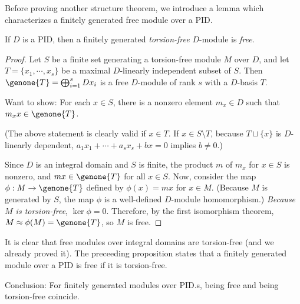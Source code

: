 Before proving another structure theorem, we introduce a lemma which characterizes a finitely generated free module over a PID.
\begin{lem}
    If $D$ is a PID, then a finitely generated \textit{torsion-free} $D$-module is \textit{free}.
\end{lem}
\begin{proof}
    Let $S$ be a finite set generating a torsion-free module $M$ over $D$, and \color{teal}let $T=\{x_1, \cdots, x_s\}$ be a maximal $D$-linearly independent subset of $S$\color{black}.
    Then $\genone{T}=\bigoplus_{i=1}^s Dx_i$ is a free $D$-module of rank $s$ with a $D$-basis $T$.
    \begin{center}
        Want to show: For each $x\in S$, there is a nonzero element $m_x\in D$ such that $m_xx\in\genone{T}$.
    \end{center}
    (The above statement is clearly valid if $x\in T$.
    If $x\in S\setminus T$, because $T\sqcup\{x\}$ is $D$-linearly dependent, $a_1x_1+\cdots+a_sx_s+bx=0$ implies $b\neq 0$.)

    Since $D$ is an integral domain and $S$ is finite, the product $m$ of $m_x$ for $x\in S$ is nonzero, and $mx\in\genone{T}$ for all $x\in S$.
    Now, consider the map $\phi: M\rightarrow\genone{T}$ defined by $\phi(x)=mx$ for $x\in M$.
    (Because $M$ is generated by $S$, the map $\phi$ is a well-defined $D$-module homomorphism.)
    \textit{Because $M$ is torsion-free}, $\ker\phi=0$.
    Therefore, by the first isomorphism theorem, $M\approx\phi(M)=\genone{T}$, so $M$ is free.
\end{proof}
\begin{rmk}
    It is clear that free modules over integral domains are torsion-free (and we already proved it).
    The preceeding proposition states that a finitely generated module over a PID is free if it is torsion-free.
    \begin{center}
        Conclusion: For finitely generated modules over PID.s, being free and being torsion-free coincide.
    \end{center}
\end{rmk}

